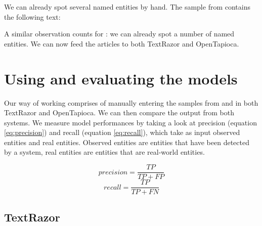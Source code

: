\documentclass[a4paper, 11pt]{article}
\begin{document}
We can already spot several named entities by hand. The sample from \citet{mckeever_2020} contains the following text:


A similar observation counts for \citet{mckeever_2020}: we can already spot a number of named entities. We can now feed the articles to both TextRazor and OpenTapioca.

\section{Using and evaluating the models}

Our way of working comprises of manually entering the samples from \citet{mcgee_2020} and \citet{mckeever_2020} in both TextRazor and OpenTapioca. We can then compare the output from both systems. We measure model performances by taking a look at precision (equation \ref{eq:precision}) and recall (equation \ref{eq:recall}), which take as input observed entities and real entities. Observed entities are entities that have been detected by a system, real entities are entities that are real-world entities. 

\begin{multicols}{2}
	\begin{equation}
	precision = \frac{TP}{TP + FP}
	\label{eq:precision}
	\end{equation}\break
	\begin{equation}
	recall = \frac{TP}{TP + FN}
	\label{eq:recall}
	\end{equation}
\end{multicols}

\subsection{TextRazor}
\end{document}
